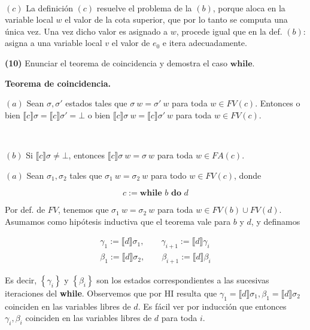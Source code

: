\documentclass[a4paper, 12pt]{article}
\begin{document}
~

$(c)$ La definición $(c)$ resuelve el problema de la $(b)$, porque aloca en la
variable local $w$ el valor de la cota superior, que por lo tanto se computa una
única vez. Una vez dicho valor es asignado a $w$, procede igual que en la def.
$(b)$: asigna a una variable local $v$ el valor de $e_0$ e itera adecuadamente.

\pagebreak 

\begin{myframe}
  \textbf{(10)} Enunciar el teorema de coincidencia  y demostra el caso $\textbf{while}$.
\end{myframe}

\begin{helpframe}
  \textbf{Teorema de coincidencia.} 

  $(a)$ Sean $\sigma, \sigma'$ estados tales
  que $\sigma ~ w = \sigma' ~ w$ para toda $w \in FV(c)$. Entonces o bien 
  $\llbracket c \rrbracket\sigma = \llbracket c \rrbracket\sigma' = \bot $ o
  bien 
  $\llbracket c \rrbracket\sigma ~ w = \llbracket c \rrbracket\sigma' ~ w$ para
  toda $w \in FV(c)$.

  ~

  $(b)$ Si $\llbracket c \rrbracket\sigma \neq \bot $, entonces $\llbracket c
  \rrbracket\sigma ~ w = \sigma ~ w$ para toda $w \in FA(c)$.
\end{helpframe}


$(a)$ Sean $\sigma_1, \sigma_2$ tales que $\sigma_1 ~ w = \sigma_2 ~ w$ para
todo $w \in FV(c)$, donde 

\begin{equation*} c := \textbf{while } b \textbf{ do } d \end{equation*}

Por def. de $FV$, tenemos que $\sigma_1 ~ w = \sigma_2 ~ w$ para toda $w \in
FV(b) \cup FV(d)$. Asumamos como hipótesis inductiva que el teorema vale para $b$ y $d$, y definamos


\begin{align*}
  \gamma_1 := \llbracket d \rrbracket\sigma_1, \qquad \gamma_{i+1} := \llbracket d
  \rrbracket\gamma_i\\
  \beta_1 := \llbracket d \rrbracket\sigma_2, \qquad \beta_{i+1} := \llbracket d
  \rrbracket\beta_i
\end{align*}

Es decir, $\left\{ \gamma_i \right\} $ y $\left\{ \beta_i \right\} $ son los
estados correspondientes a las sucesivas iteraciones del \textbf{while}.
Observemos que por HI resulta que $\gamma_1 = \llbracket d \rrbracket\sigma_1,
\beta_1 = \llbracket d \rrbracket\sigma_2$ coinciden en las variables libres de
$d$. Es fácil ver por inducción que entonces $\gamma_i, \beta_i$ coinciden en
las variables libres de $d$ para toda $i$.
\end{document}
